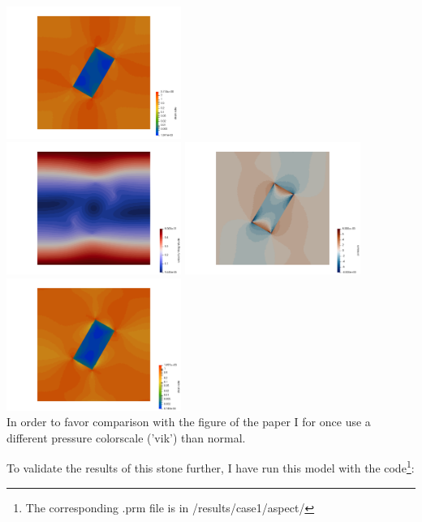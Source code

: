 \begin{center}
\includegraphics[width=5.7cm]{python_codes/fieldstone_142/results/case1/sr1}\\
\includegraphics[width=5.7cm]{python_codes/fieldstone_142/results/case1/vel2}
\includegraphics[width=5.7cm]{python_codes/fieldstone_142/results/case1/press2}
\includegraphics[width=5.7cm]{python_codes/fieldstone_142/results/case1/sr2}\\
{\captionfont In order to favor comparison with the figure of the paper I for once
use a different pressure colorscale ('vik') than normal.}
\end{center}

To validate the results of this stone further, I have run this model with the \aspect
code\footnote{The corresponding .prm file is in /results/case1/aspect/}:


